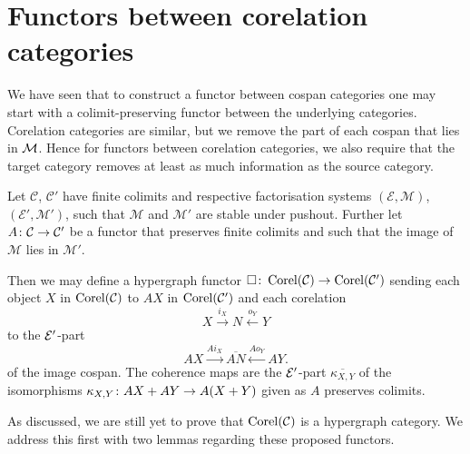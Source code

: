 \section{Functors between corelation categories}
We have seen that to construct a functor between cospan categories one may start
with a colimit-preserving functor between the underlying categories. Corelation
categories are similar, but we remove the part of each cospan that lies in $\mathcal
M$. Hence for functors between corelation categories, we also require that the
target category removes at least as much information as the source category.

\begin{proposition} \label{prop.corelfunctors}
  Let $\mathcal C$, $\mathcal C'$ have finite colimits and respective
  factorisation systems $(\mathcal E, \mathcal M)$, $(\mathcal E', \mathcal M')$,
  such that $\mathcal M$ and $\mathcal M'$ are stable under pushout. Further let
  $A{\colon} \mathcal C \to \mathcal C'$ be a functor that preserves finite colimits
  and such that the image of $\mathcal M$ lies in $\mathcal M'$.

  Then we may define a hypergraph functor $\square{\colon} \operatorname{{Corel}}(\mathcal C) \to
  \operatorname{{Corel}}(\mathcal C')$ sending each object $X$ in $\operatorname{{Corel}}(\mathcal C)$ to $AX$ in
  $\operatorname{{Corel}}(\mathcal C')$ and each corelation 
  \[
    X \stackrel{i_X}{\longrightarrow} N \stackrel{o_Y}{\longleftarrow} Y 
  \]
  to the $\mathcal E'$-part
  \[
    AX \stackrel{Ai_X}{\longrightarrow} \overline{AN}
    \stackrel{Ao_Y}{\longleftarrow} AY.
  \]
  of the image cospan. The coherence maps are the $\mathcal E'$-part
  $\overline{\kappa_{X,Y}}$ of the isomorphisms $\kappa_{X,Y}{\colon} AX+AY \to
  A(X+Y)$ given as $A$ preserves colimits.
\end{proposition}

As discussed, we are still yet to prove that $\operatorname{{Corel}}(\mathcal C)$ is a hypergraph
category. We address this first with two lemmas regarding these proposed
functors.

